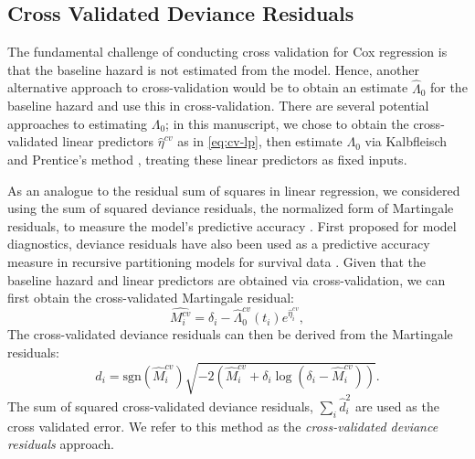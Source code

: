   \subsection{Cross Validated Deviance Residuals}

The fundamental challenge of conducting cross validation for Cox regression is that the baseline hazard is not estimated from the model. Hence, another alternative approach to cross-validation would be to obtain an estimate $\hat{\Lambda}_{0}$ for the baseline hazard and use this in cross-validation.  There are several potential approaches to estimating $\Lambda_0$; in this manuscript, we chose to obtain the cross-validated linear predictors $\hat{\eta}^{cv}$ as in \eqref{eq:cv-lp}, then estimate $\Lambda_0$ via Kalbfleisch and Prentice's method \citep{Kalbfleisch2011}, treating these linear predictors as fixed inputs.

As an analogue to the residual sum of squares in linear regression, we considered using the sum of squared deviance residuals, the normalized form of Martingale residuals, to measure the model's predictive accuracy \citep{Therneau1990}. First proposed for model diagnostics, deviance residuals have also been used as a predictive accuracy measure in recursive partitioning models for survival data \citep{Therneau2018}. Given that the baseline hazard and linear predictors are obtained via cross-validation, we can first obtain the cross-validated Martingale residual: 
	\begin{equation}
	\hat{M^{cv}_{i}} = \delta_{i} -\hat{\Lambda}^{cv}_{0}(t_{i})e^{\hat{\eta}^{cv}_{i}},
	\end{equation} 
The cross-validated deviance residuals can then be derived from the Martingale residuals: 
	\begin{equation} 
	d_{i} = \text{sgn}(\hat{M}^{cv}_{i})\sqrt{-2(\hat{M}^{cv}_{i} + \delta_{i}\log(\delta_{i} - \hat{M}^{cv}_{i}))}.
	\end{equation}
The sum of squared cross-validated deviance residuals, $\sum_{i}\hat{d}_{i}^2$ are used as the cross validated error. We refer to this method as the \emph{cross-validated deviance residuals} approach.

